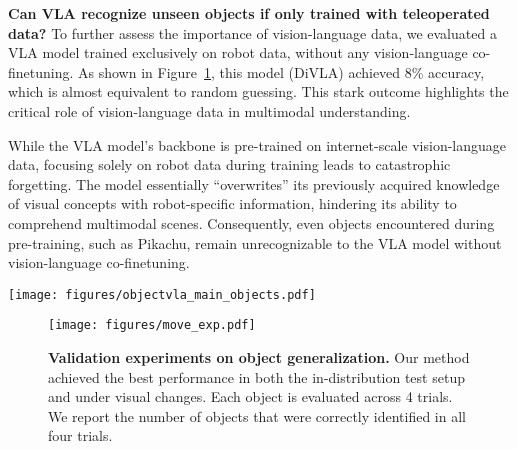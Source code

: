 \textbf{Can VLA recognize unseen objects if only trained with teleoperated data?} To further assess the importance of vision-language data, we evaluated a VLA model trained exclusively on robot data, without any vision-language co-finetuning. As shown in Figure~\ref{fig:move}, this model (DiVLA) achieved 8\% accuracy, which is almost equivalent to random guessing. This stark outcome highlights the critical role of vision-language data in multimodal understanding.

While the VLA model's backbone is pre-trained on internet-scale vision-language data, focusing solely on robot data during training leads to catastrophic forgetting. The model essentially ``overwrites'' its previously acquired knowledge of visual concepts with robot-specific information, hindering its ability to comprehend multimodal scenes. Consequently, even objects encountered during pre-training, such as Pikachu, remain unrecognizable to the VLA model without vision-language co-finetuning.

\begin{figure*}[h]
    \centering
    \texttt{[image: figures/objectvla\_main\_objects.pdf]}
    \caption{\textbf{Example Objects Used in Experiments.} \textit{Left:} Objects present in the robot training data. \textit{Right:} Examples of novel objects, not present in the robot data, but included in the visual-text co-training dataset (see Appendix for a comprehensive list).}\label{fig:seen-objs}
\end{figure*}
\begin{figure}[t]
    \centering
    \texttt{[image: figures/move\_exp.pdf]}
    \caption{\textbf{Validation experiments on object generalization.} 
Our method achieved the best performance in both the in-distribution test setup and under visual changes. Each object is evaluated across 4 trials. We report the number of objects that were correctly identified in all four trials.}
    \label{fig:move}
\end{figure}

